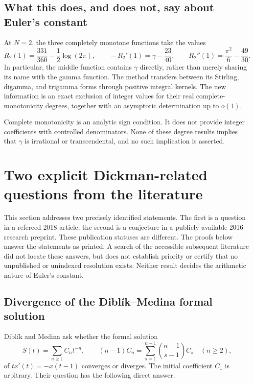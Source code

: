 \documentclass[11pt,a4paper]{article}
\theoremstyle{definition}
\theoremstyle{remark}
\numberwithin{equation}{section}
\begin{document}
\subsection{What this does, and does not, say about Euler's constant}
At $N=2$, the three completely monotone functions take the values
\[
 R_2(1)=\frac{331}{360}-\frac12\log(2\pi),\qquad
 -R_2'(1)=\gamma-\frac{23}{40},\qquad
 R_2''(1)=\frac{\pi^2}{6}-\frac{49}{30}.
\]
In particular, the middle function contains $\gamma$ directly, rather
than merely sharing its name with the gamma function. The method transfers
between its Stirling, digamma, and trigamma forms through positive
integral kernels. The new information is an exact exclusion of integer
values for their real complete-monotonicity degrees, together with an
asymptotic determination up to $o(1)$.

Complete monotonicity is an analytic sign condition. It does not provide
integer coefficients with controlled denominators. None of these degree
results implies that $\gamma$ is irrational or transcendental, and no
such implication is asserted.

\section{Two explicit Dickman-related questions from the literature}
\label{p8:sec:probability-frontier}

This section addresses two precisely identified statements. The first is a
question in a refereed 2018 article; the second is a conjecture in a publicly
available 2016 research preprint. These publication statuses are different.
The proofs below answer the statements as printed. A search of the accessible
subsequent literature did not locate these answers, but does not establish
priority or certify that no unpublished or unindexed resolution exists.
Neither result decides the arithmetic nature of Euler's constant.

\subsection{Divergence of the Dibl\'ik--Medina formal solution}

Dibl\'ik and Medina \cite[Remark~1, p.~104]{p8:DiblikMedina2018} ask whether the
formal solution
\begin{equation}\label{p8:pf:formal}
 S(t)=\sum_{n\geq1}C_nt^{-n},\qquad
 (n-1)C_n=\sum_{s=1}^{n-1}\binom{n-1}{s-1}C_s\quad(n\geq2),
\end{equation}
of $t x'(t)=-x(t-1)$ converges or diverges. The initial coefficient $C_1$ is
arbitrary. Their question has the following direct answer.
\end{document}
